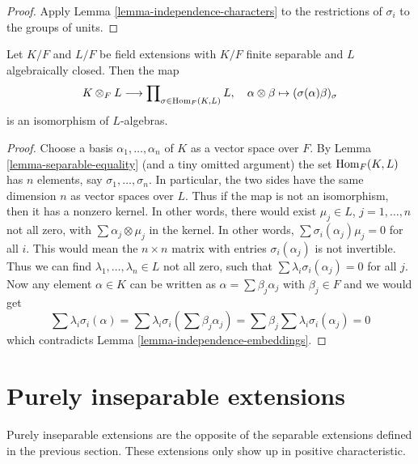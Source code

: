 \begin{proof}
Apply Lemma \ref{lemma-independence-characters} to
the restrictions of $\sigma_i$ to the groups of units.
\end{proof}

\begin{lemma}
\label{lemma-finite-separable-tensor-alg-closed}
Let $K/F$ and $L/F$ be field extensions with
$K/F$ finite separable and $L$ algebraically closed.
Then the map
$$
K \otimes_F L
\longrightarrow
\prod\nolimits_{\sigma \in \mathop{\mathrm{Hom}}\nolimits_F(K, L)} L,\quad
\alpha \otimes \beta \mapsto (\sigma(\alpha)\beta)_\sigma
$$
is an isomorphism of $L$-algebras.
\end{lemma}

\begin{proof}
Choose a basis $\alpha_1, \ldots, \alpha_n$ of $K$ as a vector space over $F$.
By Lemma \ref{lemma-separable-equality} (and a tiny omitted argument) the set
$\mathop{\mathrm{Hom}}\nolimits_F(K, L)$ has $n$ elements, say $\sigma_1, \ldots, \sigma_n$.
In particular, the two sides have the same dimension $n$ as vector
spaces over $L$. Thus if the map is not an isomorphism, then it
has a nonzero kernel. In other words, there would exist
$\mu_j \in L$, $j = 1, \ldots, n$ not all zero,
with $\sum \alpha_j \otimes \mu_j$ in the kernel.
In other words, $\sum \sigma_i(\alpha_j)\mu_j = 0$ for all $i$.
This would mean the $n \times n$ matrix with entries
$\sigma_i(\alpha_j)$ is not invertible. Thus we can find
$\lambda_1, \ldots, \lambda_n \in L$ not all zero,
such that $\sum \lambda_i\sigma_i(\alpha_j) = 0$ for all $j$.
Now any element $\alpha \in K$ can be written as
$\alpha = \sum \beta_j \alpha_j$ with $\beta_j \in F$ and we would get
$$
\sum \lambda_i\sigma_i(\alpha) =
\sum \lambda_i\sigma_i(\sum \beta_j \alpha_j) =
\sum \beta_j \sum \lambda_i\sigma_i(\alpha_j) = 0
$$
which contradicts Lemma \ref{lemma-independence-embeddings}.
\end{proof}







\section{Purely inseparable extensions}
\label{section-purely-inseparable}

\noindent
Purely inseparable extensions are the opposite of the separable
extensions defined in the previous section. These extensions only
show up in positive characteristic.

